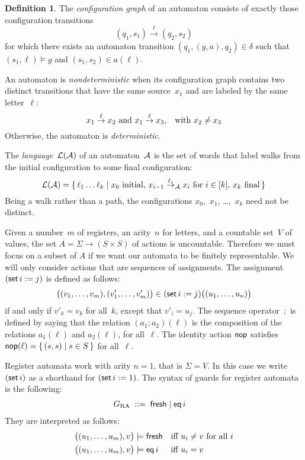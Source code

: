 \documentclass[9pt, preprint]{sigplanconf} %
\theoremstyle{definition}
\newtheorem{definition}{Definition}
\theoremstyle{remark}
\begin{document}
\begin{definition}\label{def:cgraph}
The \emph{configuration graph} of an automaton consists of exactly those configuration transitions \[ (q_1,s_1) \stackrel{\ell}{\to} (q_2,s_2) \] for which there exists an automaton transition $(q_1,(g,a),q_2)\in\delta$ such that $(s_1,\ell)\models g$ and $(s_1,s_2)\in a(\ell)$.
\end{definition}
An automaton is \emph{nondeterministic} when its configuration graph contains two distinct transitions that have the same source~$x_1$ and are labeled by the same letter~$\ell$:
\[ \text{$x_1\stackrel\ell\to x_2$ and $x_1\stackrel\ell\to x_3$,\quad with $x_2\ne x_3$} \]
Otherwise, the automaton is \emph{deterministic}.

The \emph{language}~${\cal L}({\cal A})$ of an automaton~${\cal A}$ is the set of words that label walks from the initial configuration to some final configuration:
\[ {\cal L}({\cal A}) =
  \{\,\ell_1\ldots\ell_k\mid \text{$x_0$ initial,
  $x_{i-1}\stackrel{\ell_i}\to_{\cal A} x_i$ for $i\in[k]$,
  $x_k$ final}\,\}\]
Being a walk rather than a path, the configurations $x_0$,~$x_1$, \dots,~$x_k$ need not be distinct.

\smallskip

Given a number~$m$ of registers, an arity~$n$ for letters, and a countable set~$V$ of values, the set $A=\Sigma\to(S\times S)$ of actions is uncountable.
Therefore we must focus on a subset of $A$ if we want our automata to be finitely representable.
We will only consider actions that are sequences of assignments.
The assignment $({\sf set}\,i:=j)$ is defined as follows:
\[ \bigl((v_1,\ldots,v_m),(v'_1,\ldots,v'_m)\bigr)\in
  ({\sf set}\,i:=j)\bigl((u_1,\ldots,u_n)\bigr) \]
if and only if $v'_k=v_k$ for all~$k$, except that $v'_i=u_j$.
The sequence operator~$;$ is defined by saying that the relation $(a_1;a_2)(\ell)$ is the composition of the relations $a_1(\ell)$ and $a_2(\ell)$, for all~$\ell$.
The identity action ${\sf nop}$ satisfies ${\sf nop}(\ell)=\{\,(s,s)\mid s\in S\,\}$ for all~$\ell$.

Register automata work with arity $n=1$, that is $\Sigma=V$.
In this case we write $({\sf set}\,i)$ as a shorthand for $({\sf set}\,i:=1)$.
The syntax of guards for register automata is the following:
\begin{align*}
G_{\rm RA} &\;::=\; {\sf fresh} \mid {\sf eq}\,i
\end{align*}
They are interpreted as follows:
\begin{align*}
\bigl((u_1,\ldots,u_m),v\bigr)&\models{\sf fresh}
  &&\text{iff $u_i\ne v$ for all $i$} \\
\bigl((u_1,\ldots,u_m),v\bigr)&\models{\sf eq}\,i
  &&\text{iff $u_i=v$}
\end{align*}
\end{document}
